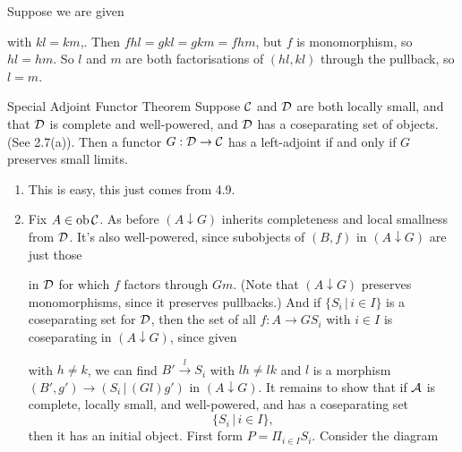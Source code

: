 \documentclass{article}
\begin{document}
\proof Suppose we are given  with $kl=km$,. Then $fhl=gkl =gkm =fhm$, but $f$ is monomorphism, so $hl=hm$. So $l$ and $m$ are both factorisations of $(hl,kl)$ through the pullback, so $l=m$. \endproof
\begin{fancythm}{Special Adjoint Functor Theorem}
    Suppose $\mathcal{C}$ and $\mathcal{D}$ are both locally small, and that $\mathcal{D}$ is complete and well-powered, and $\mathcal{D}$ has a coseparating set of objects. (See 2.7(a)). Then a functor $G: \mathcal{D} \to \mathcal{C}$ has a left-adjoint if and only if $G$ preserves small limits.
\end{fancythm}
\proof\hspace{0.1cm} \begin{enumerate}
    \item[$\Rightarrow$] This is easy, this just comes from 4.9.
    \item[$\Leftarrow$] Fix $A \in \operatorname{ob} \mathcal{C}$. As before $(A \downarrow G)$ inherits completeness and local smallness from $\mathcal{D}$. It's also well-powered, since subobjects of $(B,f)$ in $(A \downarrow G)$ are just those  in $\mathcal{D}$ for which $f$ factors through $Gm$. (Note that $(A \downarrow G)$ preserves monomorphisms, since it preserves pullbacks.) \gap 
    And if $\{S_{i} \, | \, i \in I\}$ is a coseparating set for $\mathcal{D}$, then the set of all $f: A \to GS_{i}$ with $i \in I$ is coseparating in $(A \downarrow G)$, since given  with $h \neq k$, we can find $B' \xrightarrow{l} S_{i}$ with $lh \neq lk$ and $l$ is a morphism $(B',g') \to (S_{i} \, | \, (Gl)g')$ in $(A \downarrow G)$. \gap It \newlec remains to show that if $\mathcal{A}$ is complete, locally small, and well-powered, and has a coseparating set \[ \{S_{i} \, | \, i \in I \}, \] then it has an initial object. First form $P = \Pi_{i \in I}S_{i}$. Consider the diagram \begin{center} \end{center}

\end{enumerate}
\end{document}
